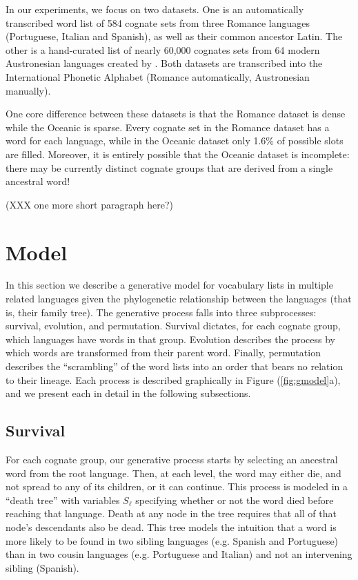 \documentclass[11pt,a4paper]{article}
\begin{document}
In our experiments, we focus on two datasets. One is an automatically
transcribed word list of 584 cognate sets from three Romance languages
(Portuguese, Italian and Spanish), as well as their common ancestor
Latin. \cite{bouchard07probabilistic} The other is a hand-curated
list of nearly 60,000 cognates sets from 64 modern Austronesian
languages created by . Both datasets are
transcribed into the International Phonetic Alphabet (Romance
automatically, Austronesian manually). 

One core difference between these datasets is that the Romance
dataset is dense while the Oceanic is sparse. Every cognate set in
the Romance dataset has a word for each language, while in the
Oceanic dataset only 1.6\% of possible slots are filled. Moreover,
it is entirely possible that the Oceanic dataset is incomplete:
there may be currently distinct cognate groups that are derived
from a single ancestral word!

(XXX one more short paragraph here?)

\section{Model}

In this section we describe a generative model for vocabulary lists
in multiple related languages given the phylogenetic relationship
between the languages (that is, their family tree). The generative
process falls into three subprocesses: survival, evolution, and
permutation. Survival dictates, for each cognate group, which
languages have words in that group. Evolution describes the process
by which words are transformed from their parent word. Finally,
permutation describes the ``scrambling'' of the word lists into an
order that bears no relation to their lineage. Each process is
described graphically in Figure (\ref{fig:gmodel}a), and we present
each in detail in the following subsections.

\subsection{Survival}

For each cognate group, our generative process starts by selecting
an ancestral word from the root language. Then, at each level, the
word may either die, and not spread to any of its children, or it
can continue. This process is modeled in a ``death tree'' with
variables $S_\ell$ specifying whether or not the word died before
reaching that language. Death at any node in the tree requires that
all of that node's descendants also be dead. This tree models the
intuition that a word is more likely to be found in two sibling
languages (e.g. Spanish and Portuguese) than in two cousin languages
(e.g. Portuguese and Italian) and not an intervening sibling
(Spanish). 
\end{document}
